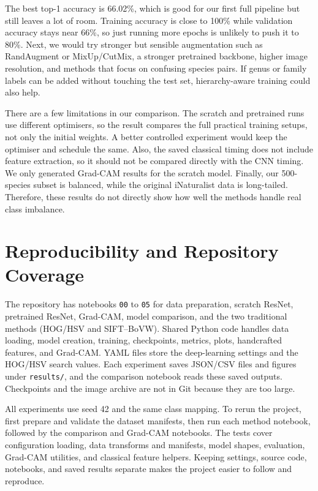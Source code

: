\documentclass[10pt,twocolumn,letterpaper]{article}
\begin{document}
The best top-1 accuracy is 66.02\%, which is good for our first full pipeline but still leaves a lot of room.  Training accuracy is close to 100\% while validation accuracy stays near 66\%, so just running more epochs is unlikely to push it to 80\%.  Next, we would try stronger but sensible augmentation such as RandAugment or MixUp/CutMix, a stronger pretrained backbone, higher image resolution, and methods that focus on confusing species pairs.  If genus or family labels can be added without touching the test set, hierarchy-aware training could also help.

There are a few limitations in our comparison.  The scratch and pretrained runs use different optimisers, so the result compares the full practical training setups, not only the initial weights.  A better controlled experiment would keep the optimiser and schedule the same.  Also, the saved classical timing does not include feature extraction, so it should not be compared directly with the CNN timing.  We only generated Grad-CAM results for the scratch model.  Finally, our 500-species subset is balanced, while the original iNaturalist data is long-tailed.  Therefore, these results do not directly show how well the methods handle real class imbalance.

\section{Reproducibility and Repository Coverage}
The repository has notebooks \texttt{00} to \texttt{05} for data preparation, scratch ResNet, pretrained ResNet, Grad-CAM, model comparison, and the two traditional methods (HOG/HSV and SIFT--BoVW).  Shared Python code handles data loading, model creation, training, checkpoints, metrics, plots, handcrafted features, and Grad-CAM.  YAML files store the deep-learning settings and the HOG/HSV search values.  Each experiment saves JSON/CSV files and figures under \texttt{results/}, and the comparison notebook reads these saved outputs.  Checkpoints and the image archive are not in Git because they are too large.

All experiments use seed 42 and the same class mapping.  To rerun the project, first prepare and validate the dataset manifests, then run each method notebook, followed by the comparison and Grad-CAM notebooks.  The tests cover configuration loading, data transforms and manifests, model shapes, evaluation, Grad-CAM utilities, and classical feature helpers.  Keeping settings, source code, notebooks, and saved results separate makes the project easier to follow and reproduce.
\end{document}
